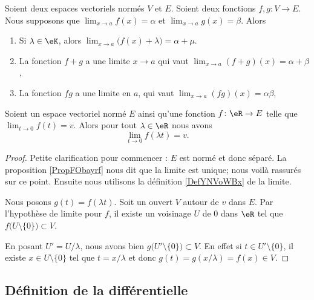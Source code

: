 \begin{proposition}     \label{PROPooBHHCooPbRggh}
	Soient deux espaces vectoriels normés \( V\) et \( E\). Soient deux fonctions \( f,g\colon V\to E\). Nous supposons que \( \lim_{x\to a} f(x)=\alpha\) et \( \lim_{x\to a} g(x)=\beta\). Alors
	\begin{enumerate}
		\item	\label{ITEMooDPBHooKRccPZ}
		      Si \( \lambda\in \eK\), alors \( \lim_{x\to a}\big( f(x)+\lambda \big)=\alpha+\mu\).
		\item   \label{ITEMooDKJPooMynOcG}
		      La fonction \( f+g\) a une limite \( x\to a\) qui vaut \( \lim_{x\to a} (f+g)(x)=\alpha+\beta\),
		\item
		      La fonction \( fg\) a une limite en \( a\), qui vaut \( \lim_{x\to a} (fg)(x)=\alpha\beta\),
	\end{enumerate}
\end{proposition}

\begin{lemma}       \label{LEMooYJGLooVBaglB}
	Soient un espace vectoriel normé \( E\) ainsi qu'une fonction \( f\colon \eR\to E\) telle que \( \lim_{t\to 0} f(t)=v\). Alors pour tout \( \lambda\in \eR\) nous avons
	\begin{equation}
		\lim_{t\to 0} f(\lambda t)=v.
	\end{equation}
\end{lemma}

\begin{proof}
	Petite clarification pour commencer : \( E\) est normé et donc séparé. La proposition \ref{PropFObayrf} nous dit que la limite est unique; nous voilà rassurés sur ce point. Ensuite nous utilisons la définition \ref{DefYNVoWBx} de la limite.

	Nous posons \( g(t)=f(\lambda t)\). Soit un ouvert \( V\) autour de \( v\) dans \( E\). Par l'hypothèse de limite pour \( f\), il existe un voisinage \( U\) de \( 0\) dans \( \eR\)  tel que \( f\big( U\setminus\{ 0 \} \big)\subset V\).

	En posant \( U'=U/\lambda\), nous avons bien \( g\big( U'\setminus\{ 0 \} \big)\subset V\). En effet si \( t\in U'\setminus\{ 0 \}\), il existe \( x\in U\setminus\{ 0 \}\) tel que \( t=x/\lambda\) et donc \( g(t)=g(x/\lambda)=f(x)\in V\).
\end{proof}

\subsection{Définition de la différentielle}

